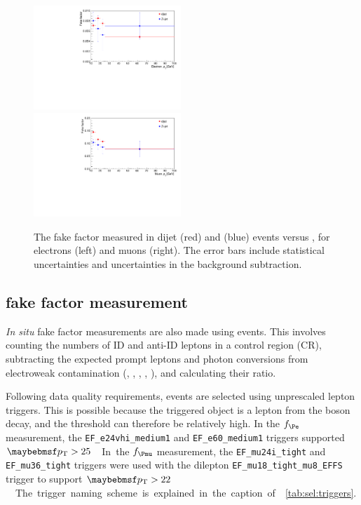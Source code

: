 \begin{figure}
	\includegraphics[width=0.495\textwidth]{custom_images/wjets/ff_el_data}
	\hfill
	\includegraphics[width=0.495\textwidth]{custom_images/wjets/ff_mu_data}
	\caption{The fake factor measured in dijet (red) and \Zjets (blue) events versus \pt, 
	for electrons (left) and muons (right). The error bars include statistical 
	uncertainties and uncertainties in the background subtraction.}
	\label{fig:wjets:ff_data}
\end{figure}



\subsection{\Zjets fake factor measurement}
\label{sec:wjets:zjet_ff}

\textit{In situ} fake factor measurements are also made using \Zjets events. This 
involves counting the numbers of ID and anti-ID leptons in a \Zjets control region (CR), 
subtracting the expected prompt leptons and photon conversions from electroweak 
contamination (\Zgamma, \ZZ, \Zgstar, \WZ, \Wgstar), and calculating their ratio.

Following data quality requirements, events are selected using unprescaled lepton 
triggers. This is possible because the triggered object is a lepton from the \PZ boson 
decay, and the \pt threshold can therefore be relatively high. In the $f_{\Pe}$ 
measurement, the \verb|EF_e24vhi_medium1| and \verb|EF_e60_medium1| triggers supported 
\unit{$\pt > 25$}{\GeV}. In the $f_{\Pmu}$ measurement, the \verb|EF_mu24i_tight| and 
\verb|EF_mu36_tight| triggers were used with the dilepton \verb|EF_mu18_tight_mu8_EFFS| 
trigger to support \unit{$\pt > 22$}{\GeV}. The trigger naming scheme is explained in the 
caption of \Table~\ref{tab:sel:triggers}.

